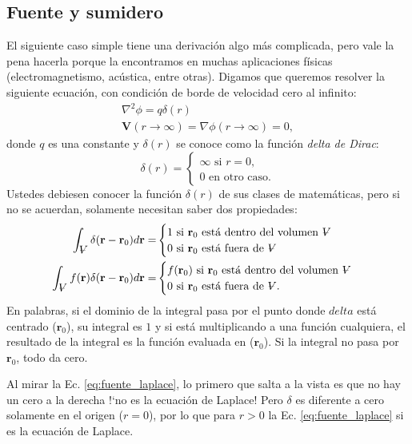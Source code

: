 \subsection*{Fuente y sumidero}
El siguiente caso simple tiene una derivación algo más complicada, pero vale la pena hacerla porque la encontramos en muchas aplicaciones físicas (electromagnetismo, acústica, entre otras).
Digamos que queremos resolver la siguiente ecuación, con condición de borde de velocidad cero al infinito:
%
\begin{align}\label{eq:fuente_laplace}
\nabla^2\phi=q\delta(r)\nonumber\\
\mathbf{V}(r\to\infty)=\nabla\phi(r\to\infty) = 0,
\end{align}
%
donde $q$ es una constante y $\delta(r)$ se conoce como la función \emph{delta de Dirac}:
%
\begin{equation}
\delta(r) = 
\begin{cases}
\infty \text{ si } r=0,\\
0 \text{ en otro caso.}
\end{cases}
\end{equation}
%
Ustedes debiesen conocer la función $\delta(r)$ de sus clases de matemáticas, pero si no se acuerdan, solamente necesitan saber dos propiedades:
%
\begin{align}\label{eq:prop_delta}
\int_{\vol} \delta(\mathbf{r}-\mathbf{r}_0)d\mathbf{r}=&
\begin{cases}
1 \text{ si $\mathbf{r}_0$ está dentro del volumen $\vol$}\\
0 \text{ si $\mathbf{r}_0$ está fuera de $\vol$}
\end{cases}\nonumber\\
\int_{\vol} f(\mathbf{r}) \delta(\mathbf{r}-\mathbf{r}_0)d\mathbf{r}=&
\begin{cases}
f(\mathbf{r}_0) \text{ si $\mathbf{r}_0$ está dentro del volumen $\vol$}\\
0 \text{ si $\mathbf{r}_0$ está fuera de $\vol$.}
\end{cases}
\end{align}
%
En palabras, si el dominio de la integral pasa por el punto donde $delta$ está centrado ($\mathbf{r}_0$), su integral es $1$ y si está multiplicando a una función cualquiera, el resultado de la integral es la función evaluada en ($\mathbf{r}_0$).
Si la integral no pasa por $\mathbf{r}_0$, todo da cero.

Al mirar la Ec. \eqref{eq:fuente_laplace}, lo primero que salta a la vista es que no hay un cero a la derecha \mbox{!`}no es la ecuación de Laplace!
Pero $\delta$ es diferente a cero solamente en el origen ($r=0$), por lo que para $r>0$ la Ec. \eqref{eq:fuente_laplace} si es la ecuación de Laplace.

